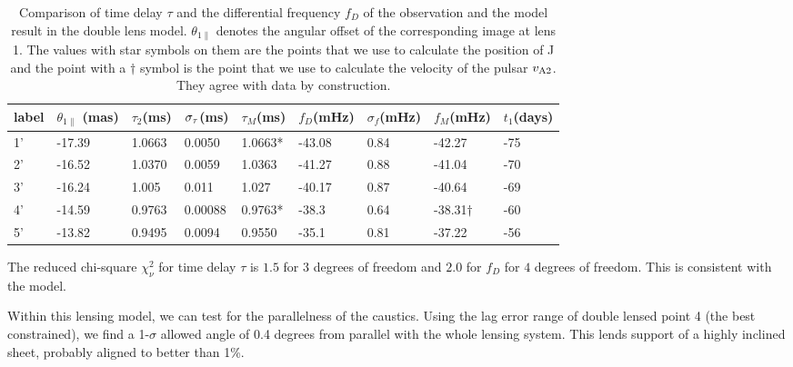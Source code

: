 \documentclass[useAMS,usenatbib]{mn2e}
\begin{document}
\begin{table}
\centering
\begin{tabular}{lllllllll}
\hline
label&$\theta_{1\parallel}$ (mas)  & $\tau_2$(ms) & $\sigma_{\rm \tau}$(ms)  & $\tau_M$(ms) & $f_D$(mHz)  &$\sigma_{f}$(mHz)      &  $f_M$(mHz)& $t_1$(days) \\ \hline
1'&-17.39  &  1.0663     &0.0050    & 1.0663*        & -43.08    &0.84   & -42.27           & -75\\
 2'&-16.52  &    1.0370     &0.0059    & 1.0363       & -41.27    &0.88   & -41.04          & -70\\ 
3'&-16.24  &   1.005    &0.011   & 1.027          & -40.17    &0.87   & -40.64          & -69\\ 
 4'&-14.59  &   0.9763    &0.00088   & 0.9763*       & -38.3     &0.64    & -38.31$\dagger$ & -60\\ 
5'&-13.82  &    0.9495     &0.0094    & 0.9550       & -35.1     &0.81    & -37.22          & -56\\ 
 \hline
\end{tabular}
\caption{Comparison of time delay $\tau$ and the differential
  frequency $f_D$ of the observation and the model result in the
  double lens model. $\theta_{1\parallel}$ denotes the angular offset
  of the corresponding image at lens 1. 
The values with star symbols on them are the points that we use to
calculate the position of J and the point with a $\dagger$ symbol is
the point that we use to calculate the velocity of the pulsar $v_{\rm
  A2}$.  They agree with data by construction. }
\label{table:double_lens_compare}
\end{table}

The reduced chi-square ${\chi}^2_{\nu}$ for time delay $\tau$ is $1.5$
for $3$ degrees of freedom
and $2.0$ for $f_D$ for $4$ degrees of freedom.  This is consistent
with the model.


Within this lensing model, we can test for the parallelness of the
caustics.  Using the lag error range of double lensed point 4 (the best
constrained), we find a 1-$\sigma$ allowed angle of 0.4 degrees from
parallel with the whole lensing system.  This lends support of a
highly inclined sheet, probably aligned to better than 1\%.
\end{document}
